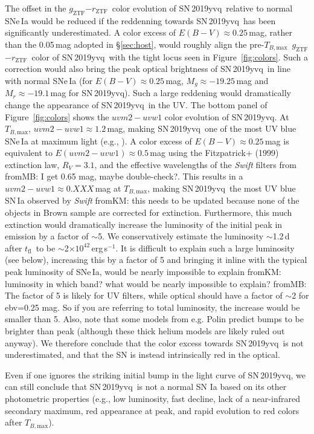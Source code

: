 \documentclass[twocolumn]{aastex63}
\newcommand{\fromkate}[1]{{\color{brown} fromKM: {#1}}}
\newcommand{\frommb}[1]{{\color{purple} fromMB: {#1}}}
\newcommand{\rztf}{$r_\mathrm{ZTF}$}
\newcommand{\gztf}{$g_\mathrm{ZTF}$}
\newcommand{\tfl}{$t_\mathrm{fl}$}
\newcommand{\tbmax}{$T_{B,\mathrm{max}}$}
\newcommand{\sn}{SN\,2019yvq}
\begin{document}
The offset in the \gztf$ - $\rztf\ color evolution of \sn\ relative to normal
SNe\,Ia would be reduced if the reddenning towards \sn\ has been
significantly underestimated. A color excess of $E(B-V) \approx 0.25$\,mag,
rather than the 0.05\,mag adopted in \S\ref{sec:host}, would roughly align
the pre-\tbmax\ \gztf$ - $\rztf\ color of \sn\ with the tight locus seen in
Figure~\ref{fig:colors}. Such a correction would also bring the peak optical
brightness of \sn\ in line with normal SNe\,Ia (for $E(B-V) \approx
0.25$\,mag, $M_g \approx -19.25$\,mag and $M_r \approx -19.1$\,mag for \sn).
Such a large reddening would dramatically change the appearance of \sn\ in
the UV. The bottom panel of Figure~\ref{fig:colors} shows the $uvm2 - uvw1$
color evolution of \sn. At \tbmax, $uvm2 - uvw1 \approx 1.2$\,mag, making
\sn\ one of the most UV blue SNe\,Ia at maximum light (e.g.,
\citealt{Milne10,Brown17}). A color excess of $E(B-V)
\approx 0.25$\,mag is equivalent to $E(uvm2 - uvw1)
\approx 0.5$\,mag using the Fitzpatrick+ (1999) extinction law, $R_V = 3.1$, and the effective wavelengths of the \textit{Swift} filters from \citet{Brown17} \frommb{I get 0.65 mag, maybe double-check?}. This results in a $uvm2 - uvw1 \approx 0.XXX$\,mag at \tbmax,
making \sn\ the most UV blue SN\,Ia observed by \textit{Swift} \fromkate{this needs to be updated because none of the objects in Brown sample are corrected for extinction}. Furthermore,
this much extinction would dramatically increase the luminosity of the initial
peak in emission by a factor of $\sim$5. We conservatively estimate the
luminosity $\sim$1.2\,d after \tfl\ to be $\sim$2$\times
10^{42}$\,erg\,s$^{-1}$. It is difficult to explain such a large luminosity
(see below), increasing this by a factor of 5 and bringing it inline with the
typical peak luminosity of SNe\,Ia, would be nearly impossible to explain \fromkate{luminosity in which band? what would be nearly impossible to explain?} \frommb{The factor of 5 is likely for UV filters, while optical should have a factor of $\sim$2 for ebv=0.25 mag. So if you are referring to total luminosity, the increase would be smaller than 5. Also, note that some models from e.g. Polin predict bumps to be brighter than peak (although these thick helium models are likely ruled out anyway)}. We
therefore conclude that the color excess towards \sn\ is not underestimated,
and that the SN is instead intrinsically red in the optical.

Even if one ignores the striking initial bump in the light curve of \sn, we
can still conclude that \sn\ is not a normal SN Ia based on its other
photometric properties (e.g., low luminosity, fast decline, lack of a
near-infrared secondary maximum, red appearance at peak, and rapid evolution
to red colors after \tbmax).
\end{document}

